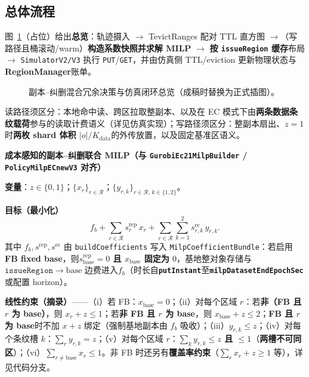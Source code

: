 \documentclass[conference]{IEEEtran}
\begin{document}
\subsection{总体流程}
图~\ref{fig:overview}（占位）给出\textbf{总览}：轨迹摄入 $\rightarrow$ TevictRanges 配对 TTL 直方图 $\rightarrow$（写路径且桶滚动/warm）\textbf{构造系数快照并求解 MILP} $\rightarrow$ \textbf{按 \texttt{issueRegion} 缓存}布局 $\rightarrow$ \texttt{SimulatorV2/V3} 执行 \texttt{PUT}/\texttt{GET}，并由仿真侧 TTL/eviction 更新物理状态与\textbf{RegionManager}账单。

\begin{figure}[t]
\centering
{}
\caption{副本--纠删混合冗余决策与仿真闭环总览（成稿时替换为正式插图）。}
\label{fig:overview}
\end{figure}

读路径须区分：本地命中读、跨区拉取整副本、以及在 EC 模式下由\textbf{两条数据条纹载荷}参与的读取计费语义（详见仿真实现）；写路径须区分：整副本扇出、$z{=}1$ 时\textbf{两枚 shard 体积 $|o|/K_{\mathrm{data}}$}的外传放置，以及固定基准区语义。

\textbf{成本感知的副本--纠删联合 MILP（与 \texttt{GurobiEc21MilpBuilder} / \texttt{PolicyMilpECnewV3} 对齐）}

\textbf{变量}：$z\in\{0,1\}$；$\{x_r\}_{r\in\mathcal{R}}$；$\{y_{r,k}\}_{r\in\mathcal{R},\,k\in\{1,2\}}$。

\textbf{目标（最小化）}
\begin{equation}
    f_b+\sum_{r\in\mathcal{R}} s^{\mathrm{rep}}_r\,x_r+\sum_{r\in\mathcal{R}}\sum_{k=1}^{2} s^{\mathrm{ec}}_{r,k}\,y_{r,k}.
\end{equation}
其中 $f_b,s^{\mathrm{rep}},s^{\mathrm{ec}}$ 由 \texttt{buildCoefficients} 写入 \texttt{MilpCoefficientBundle}：若启用\textbf{FB fixed base}，则\textbf{$s^{\mathrm{rep}}_{\mathrm{base}}{=}0$ 且 $x_{\mathrm{base}}$ 固定为 $0$}，基地整对象存储与 $\texttt{issueRegion}{\rightarrow}\mathrm{base}$ 边费进入\textbf{$f_b$}（时长自\textbf{\texttt{putInstant}}至\textbf{\texttt{milpDatasetEndEpochSec}}或配置 horizon）。

\textbf{线性约束（摘录）}——（i）若 FB：\textbf{$x_{\mathrm{base}}{=}0$}；（ii）对每个区域 $r$：若\textbf{非（FB 且 $r$ 为 base）}，则 \textbf{$x_r+z\leq 1$}；若\textbf{非 FB 且 $r$ 为 base}，则 \textbf{$x_{\mathrm{base}}+z\leq 2$}；\textbf{FB 且 $r$ 为 base}时不加 $x{+}z$ 绑定（强制基地副本由 $f_b$ 吸收）；（iii）\textbf{$y_{r,k}\leq z$}；（iv）对每个条纹槽 $k$：\textbf{$\sum_{r} y_{r,k}=z$}；（v）对每个区域 $r$：\textbf{$\sum_{k} y_{r,k}\leq z$ 且 $\leq 1$}（\textbf{两槽不可同区}）；（vi）\textbf{$\sum_{r\neq \mathrm{base}} x_r\leq 1$}。非 FB 时还另有\textbf{覆盖率约束}（$\sum_r x_r+z\geq 1$ 等），详见代码分支。
\end{document}

